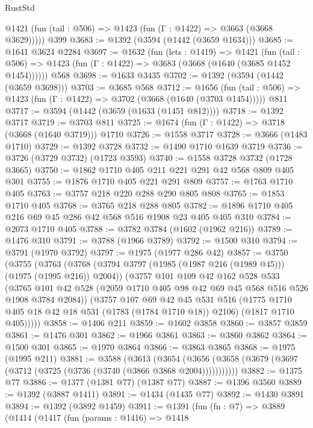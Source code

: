 \begin{lexlean}{RustStd}
\begin{coremodule}
      @1421 (fun (tail : @506) => @1423 (fun (Γ : @1422) => @3663 (@3668 @3629)))))
    @399
@3683 := @1392 (@3594 (@1442 (@3659 @1634)))
@3685 := @1641 @3624 @2284
@3697 := @1632
    (fun (lets : @1419) =>
    @1421
      (fun (tail : @506) => @1423 (fun (Γ : @1422) => @3683 (@3668 (@1640 (@3685 @1452 @1454))))))
    @568
@3698 := @1633 @3435
@3702 := @1392 (@3594 (@1442 (@3659 @3698)))
@3703 := @3685 @568
@3712 := @1656
    (fun (tail : @506) => @1423 (fun (Γ : @1422) => @3702 (@3668 (@1640 (@3703 @1454)))))
    @811
@3717 := @3594 (@1442 (@3659 (@1633 (@1451 @812))))
@3718 := @1392 @3717
@3719 := @3703 @811
@3725 := @1674 (fun (Γ : @1422) => @3718 (@3668 (@1640 @3719))) @1710
@3726 := @1558 @3717
@3728 := @3666 (@1483 @1710)
@3729 := @1392 @3728
@3732 := @1490 @1710 @1639 @3719
@3736 := @3726 (@3729 @3732) (@1723 @3593)
@3740 := @1558 @3728 @3732 (@1728 @3665)
@3750 := @1862 @1710 @405 @211 @221 @291 @42 @568 @809 @405 @301
@3755 := @1876 @1710 @405 @221 @291 @809
@3757 := @1763 @1710 @405
@3763 := @3757 @218 @220 @288 @290 @805 @808
@3765 := @1853 @1710 @405
@3768 := @3765 @218 @288 @805
@3782 := @1896 @1710 @405 @216 @69 @45 @286 @42 @568 @516 @1908 @23 @405 @405 @310
@3784 := @2073 @1710 @405
@3788 := @3782 @3784 (@1602 (@1962 @216))
@3789 := @1476 @310
@3791 := @3788 (@1966 @3789)
@3792 := @1500 @310
@3794 := @3791 (@1970 @3792)
@3797 := @1975 (@1977 @286 @42)
@3857 := @3750
    (@3755
      (@3763
        (@3768 (@3794 @3797 (@1985 (@1987 @216 (@1989 @45))) (@1975 (@1995 @216)) @2004))
        (@3757
          @101
          @109
          @42
          @162
          @528
          @533
          (@3765 @101 @42 @528 (@2059 @1710 @405 @98 @42 @69 @45 @568 @516 @526 @1908 @3784 @2084))
          (@3757
            @107
            @69
            @42
            @45
            @531
            @516
            (@1775 @1710 @405 @18 @42 @18 @531 (@1783 (@1784 @1710 @18)) @2106)
            (@1817 @1710 @405)))))
@3858 := @1406 @211
@3859 := @1602 @3858
@3860 := @3857 @3859
@3861 := @1476 @301
@3862 := @1966 @3861
@3863 := @3860 @3862
@3864 := @1500 @301
@3865 := @1970 @3864
@3866 := @3863 @3865
@3868 := @1975 (@1995 @211)
@3881 := @3588
    (@3613
      (@3654 (@3656 (@3658 (@3679 (@3697 (@3712 (@3725 (@3736 (@3740 (@3866 @3868 @2004)))))))))))
@3882 := @1375 @77
@3886 := @1377 (@1381 @77) (@1387 @77)
@3887 := @1396 @3560
@3889 := @1392 (@3887 @1411)
@3891 := @1434 (@1435 @77)
@3892 := @1430 @3891
@3894 := @1392 (@3892 @1459)
@3911 := @1391
    (fun (fn : @7) =>
    @3889
      (@1414
        (@1417
          (fun (params : @1416) =>
          @1418

\end{coremodule}
\end{lexlean}
